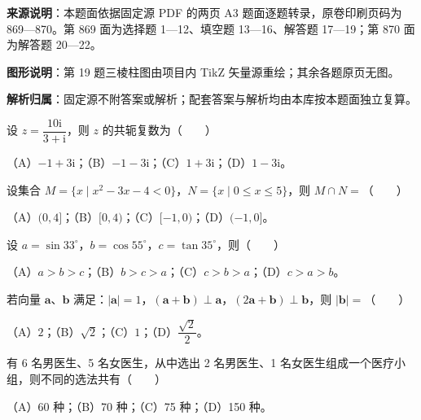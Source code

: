 

\begin{gknotice}
\textbf{来源说明}：本题面依据固定源 PDF 的两页 A3 题面逐题转录，原卷印刷页码为 869—870。第 869 面为选择题 1—12、填空题 13—16、解答题 17—19；第 870 面为解答题 20—22。

\textbf{图形说明}：第 19 题三棱柱图由项目内 TikZ 矢量源重绘；其余各题原页无图。

\textbf{解析归属}：固定源不附答案或解析；配套答案与解析均由本库按本题面独立复算。
\end{gknotice}


\begin{question}
设 $z=\dfrac{10\mathrm i}{3+\mathrm i}$，则 $z$ 的共轭复数为\mbox{（　　）}

（A）$-1+3\mathrm i$；（B）$-1-3\mathrm i$；（C）$1+3\mathrm i$；（D）$1-3\mathrm i$。

\end{question}
\begin{question}
设集合 $M=\{x\mid x^2-3x-4<0\}$，$N=\{x\mid 0\leqslant x\leqslant 5\}$，则 $M\cap N=$\mbox{（　　）}

（A）$(0,4]$；（B）$[0,4)$；（C）$[-1,0)$；（D）$(-1,0]$。

\end{question}
\begin{question}
设 $a=\sin33^\circ$，$b=\cos55^\circ$，$c=\tan35^\circ$，则\mbox{（　　）}

（A）$a>b>c$；（B）$b>c>a$；（C）$c>b>a$；（D）$c>a>b$。

\end{question}
\begin{question}
若向量 $\boldsymbol a$、$\boldsymbol b$ 满足：$|\boldsymbol a|=1$，$(\boldsymbol a+\boldsymbol b)\perp\boldsymbol a$，$(2\boldsymbol a+\boldsymbol b)\perp\boldsymbol b$，则 $|\boldsymbol b|=$\mbox{（　　）}

（A）$2$；（B）$\sqrt2$；（C）$1$；（D）$\dfrac{\sqrt2}{2}$。

\end{question}
\begin{question}
有 6 名男医生、5 名女医生，从中选出 2 名男医生、1 名女医生组成一个医疗小组，则不同的选法共有\mbox{（　　）}

（A）60 种；（B）70 种；（C）75 种；（D）150 种。

\end{question}
